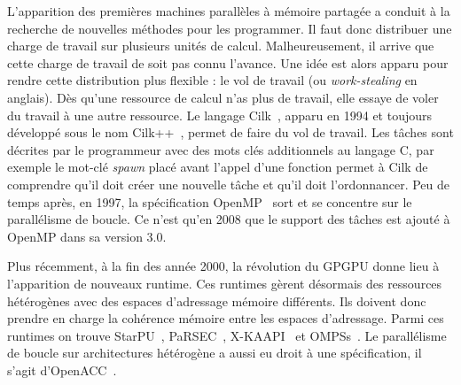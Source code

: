 L'apparition des premières machines parallèles à mémoire partagée a conduit à la recherche de nouvelles méthodes pour les programmer.
%
Il faut donc distribuer une charge de travail sur plusieurs unités de calcul.
%
Malheureusement, il arrive que cette charge de travail de soit pas connu l'avance.
%
Une idée est alors apparu pour rendre cette distribution plus flexible : le vol de travail (ou {\em work-stealing} en anglais).
%
Dès qu'une ressource de calcul n'as plus de travail, elle essaye de voler du travail à une autre ressource.
%
Le langage Cilk~\cite{Cilk}, apparu en 1994 et toujours développé sous le nom Cilk++~\cite{Cilk++}, permet de faire du vol de travail.
%
Les tâches sont décrites par le programmeur avec des mots clés additionnels au langage C, par exemple le mot-clé {\em spawn} placé avant l'appel d'une fonction permet à Cilk de comprendre qu'il doit créer une nouvelle tâche et qu'il doit l'ordonnancer.
%
Peu de temps après, en 1997, la spécification OpenMP~\cite{OpenMP} sort et se concentre sur le parallélisme de boucle.
%
Ce n'est qu'en 2008 que le support des tâches est ajouté à OpenMP dans sa version 3.0.


Plus récemment, à la fin des année 2000, la révolution du GPGPU donne lieu à l'apparition de nouveaux runtime.
%
Ces runtimes gèrent désormais des ressources hétérogènes avec des espaces d'adressage mémoire différents.
%
Ils doivent donc prendre en charge la cohérence mémoire entre les espaces d'adressage.
%
Parmi ces runtimes on trouve StarPU~\cite{starpu}, PaRSEC~\cite{PaRSEC}, X-KAAPI~\cite{xkaapi} et OMPSs~\cite{OMPSs}.
%
Le parallélisme de boucle sur architectures hétérogène a aussi eu droit à une spécification, il s'agit d'OpenACC~\cite{OpenACC}.

